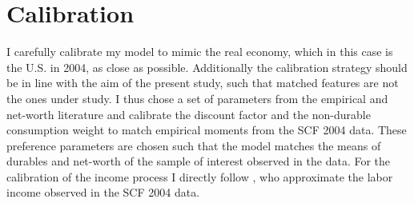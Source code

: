 \documentclass[a4paper,12pt,legno]{article}
\begin{document}
\section{Calibration}
I carefully calibrate my model to mimic the real economy, which in this case is the U.S. in 2004, as close as possible. Additionally the calibration strategy should be in line with the aim of the present study, such that matched features are not the ones under study. I thus chose a set of parameters from the empirical and net-worth literature and calibrate the discount factor and the non-durable consumption weight to match empirical moments from the SCF 2004 data. These preference parameters are chosen such that the model matches the means of durables and net-worth of the sample of interest observed in the data. For the calibration of the income process I directly follow \cite{hintermaier2011}, who approximate the labor income observed in the SCF 2004 data. 
\end{document}
